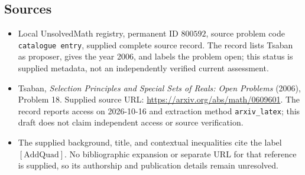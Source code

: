 \documentclass[11pt]{article}
\begin{document}
\subsection{Sources}
\begin{itemize}
\item Local UnsolvedMath registry, permanent ID \(800592\), source problem code \texttt{catalogue entry}, supplied complete source record. The record lists Tsaban as proposer, gives the year 2006, and labels the problem open; this status is supplied metadata, not an independently verified current assessment.
\item Tsaban, \emph{Selection Principles and Special Sets of Reals: Open Problems} (2006), Problem 18. Supplied source URL: \url{https://arxiv.org/abs/math/0609601}. The record reports access on 2026-10-16 and extraction method \texttt{arxiv\_latex}; this draft does not claim independent access or source verification.
\item The supplied background, title, and contextual inequalities cite the label \([\mathrm{AddQuad}]\). No bibliographic expansion or separate URL for that reference is supplied, so its authorship and publication details remain unresolved.
\end{itemize}
\end{document}
